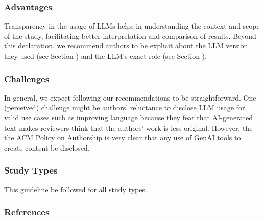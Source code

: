 \subsubsection{Advantages}

Transparency in the usage of LLMs helps in understanding the context and scope of the study, facilitating better interpretation and comparison of results.
Beyond this declaration, we recommend authors to be explicit about the LLM version they used (see Section \modelversion) and the LLM's exact role (see Section \toolarchitecture).


\subsubsection{Challenges}

In general, we expect following our recommendations to be straightforward.
One (perceived) challenge might be authors' reluctance to disclose LLM usage for valid use cases such as improving language because they fear that AI-generated text makes reviewers think that the authors' work is less original.
However, the the ACM Policy on Authorship is very clear that any use of GenAI tools to create content \must be disclosed.


\subsubsection{Study Types}

This guideline \must be followed for all study types.


\subsubsection{References}





